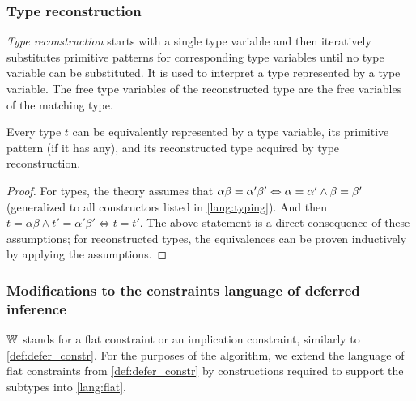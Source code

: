 \subsubsection{Type reconstruction}

\emph{Type reconstruction} starts with a single type variable and then iteratively substitutes primitive patterns for corresponding type variables until no type variable can be substituted. It is used to interpret a type represented by a type variable. The free type variables of the reconstructed type are the free variables of the matching type.

\begin{lemma}
    \label{typesObs}
    Every type $t$ can be equivalently represented by a type variable, its primitive pattern (if it has any), and its reconstructed type acquired by type reconstruction.

    \begin{proof}
        For types, the theory assumes that  $\alpha \beta = \alpha' \beta' \Leftrightarrow \alpha = \alpha' \land \beta = \beta'$  (generalized to all constructors listed in \cref{lang:typing}). And then $t = \alpha \beta \land t' = \alpha' \beta' \Leftrightarrow t = t'$. The above statement is a direct consequence of these assumptions; for reconstructed types, the equivalences can be proven inductively by applying the assumptions.
    \end{proof}
\end{lemma}


\subsubsection{Modifications to the constraints language of deferred inference}

$\mathbb{W}$ stands for a flat constraint or an implication constraint, similarly to \cref{def:defer_constr}. For the purposes of the algorithm, we extend the language of flat constraints from \cref{def:defer_constr} by constructions required to support the subtypes into \cref{lang:flat}.

